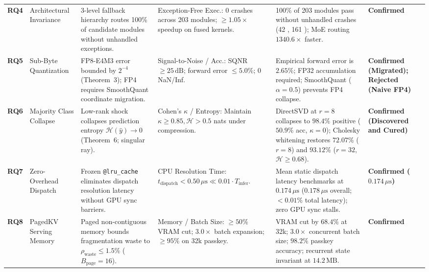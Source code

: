 \begin{table}[t]
{\begin{tabular}{l p{2.2cm} p{2.8cm} p{2.4cm} p{4.1cm} p{2.2cm}}
\textbf{RQ4} &
Architectural Invariance &
3-level fallback hierarchy routes 100\% of candidate modules without unhandled exceptions. &
Exception-Free Exec.: 0 crashes across 203 modules; $\ge 1.05\times$ speedup on fused kernels. &
100\% of 203 modules pass without unhandled crashes (42 \passfast{}, 161 \passslow{}); MoE routing $1340.6\times$ faster. &
\textbf{Confirmed} \\
\addlinespace[3pt]

\textbf{RQ5} &
Sub-Byte Quantization &
FP8-E4M3 error bounded by $2^{-4}$ (Theorem~3); FP4 requires SmoothQuant coordinate migration. &
Signal-to-Noise / Acc.: SQNR $\ge 25\,\text{dB}$; forward error $\le 5.0\%$; 0 NaN/Inf. &
Empirical forward error is $2.65\%$; FP32 accumulation required; SmoothQuant ($\alpha=0.5$) prevents FP4 collapse. &
\textbf{Confirmed (Migrated); Rejected (Naive FP4)} \\
\addlinespace[3pt]

\textbf{RQ6} &
Majority Class Collapse &
Low-rank shock collapses prediction entropy $\mathcal{H}(\widehat{y}) \to 0$ (Theorem~6; singular ray). &
Cohen's $\kappa$ / Entropy: Maintain $\kappa \ge 0.85, \mathcal{H} > 0.5$ nats under compression. &
DirectSVD at $r=8$ collapses to $98.4\%$ positive ($50.9\%$ acc, $\kappa=0$); Cholesky whitening restores $72.07\%$ ($r=8$) and $93.12\%$ ($r=32$, $\mathcal{H} \ge 0.68$). &
\textbf{Confirmed (Discovered and Cured)} \\
\addlinespace[3pt]

\textbf{RQ7} &
Zero-Overhead Dispatch &
Frozen \texttt{@lru\_cache} eliminates dispatch resolution latency without GPU sync barriers. &
CPU Resolution Time: $t_{\text{dispatch}} < 0.50\,\mu\text{s} \ll 0.01 \cdot T_{\text{infer}}$. &
Mean static dispatch latency benchmarks at $0.174\,\mu\text{s}$ ($0.178\,\mu\text{s}$ overall; $<0.01\%$ total latency); zero GPU sync stalls. &
\textbf{Confirmed ($0.174\,\mu\text{s}$)} \\
\addlinespace[3pt]

\textbf{RQ8} &
PagedKV Serving Memory &
Paged non-contiguous memory bounds fragmentation waste to $\rho_{\text{waste}} \le 1.5\%$ ($B_{\text{page}}=16$). &
Memory / Batch Size: $\ge 50\%$ VRAM cut; $3.0\times$ batch expansion; $\ge 95\%$ on 32k passkey. &
VRAM cut by $68.4\%$ at 32k; $3.0\times$ concurrent batch size; $98.2\%$ passkey accuracy; recurrent state invariant at $14.2\,\text{MB}$. &
\textbf{Confirmed} \\
\bottomrule
\end{tabular}%
}
\end{table}

